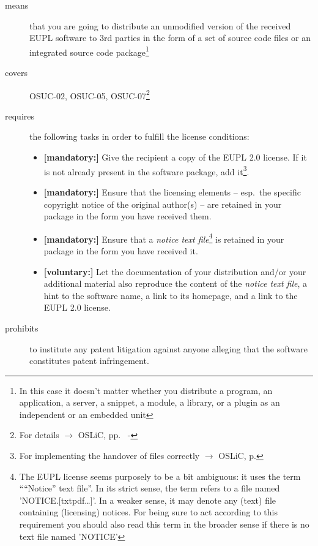 \begin{description}
\item[means] that you are going to distribute an unmodified version of the
received EUPL software to 3rd parties in the form of a set of source code files or
an integrated source code package\footnote{In this case it doesn't matter
whether you  distribute a program, an application, a server, a snippet, a
module, a library, or a plugin as an independent or an embedded unit}

\item[covers] OSUC-02, OSUC-05, OSUC-07\footnote{For details $\rightarrow$ OSLiC, pp.\ 
\pageref{OSUC-02-DEF} - \pageref{OSUC-07-DEF}}

\item[requires] the following tasks in order to fulfill the license conditions:
\begin{itemize}
  \item \textbf{[mandatory:]} Give the recipient a copy of the EUPL 2.0
  license. If it is not already present in the software package, add
  it\footnote{For implementing the handover of files correctly $\rightarrow$
  OSLiC, p. \pageref{DistributingFilesHint}}.
  \item \textbf{[mandatory:]} Ensure that the licensing elements -- esp.\ the
  specific copyright notice of the original author(s) -- are retained in your
  package in the form you have received them.
  \item \textbf{[mandatory:]} Ensure that a \emph{notice text file}\footnote{
  The EUPL license seems purposely to be a bit ambiguous: it uses the term
  \enquote{``Notice'' text file}. In its strict sense, the term refers to a file
  named 'NOTICE.[txt\textbar{}pdf\textbar{}\ldots]'. In a weaker sense, it may
  denote any (text) file containing (licensing) notices. For being sure to act
  according to this requirement you should also read this term in the broader
  sense if there is no text file named 'NOTICE'} is retained in your package in
  the form you have received it.
  
  \item \textbf{[voluntary:]} Let the documentation of your distribution and/or
  your additional material also reproduce the content of the \emph{notice text
  file}, a hint to the software name, a link to its homepage, and a link to the
  EUPL 2.0 license.
\end{itemize}

\item[prohibits] to institute any patent litigation against anyone alleging that
the software constitutes patent infringement.

\end{description}


